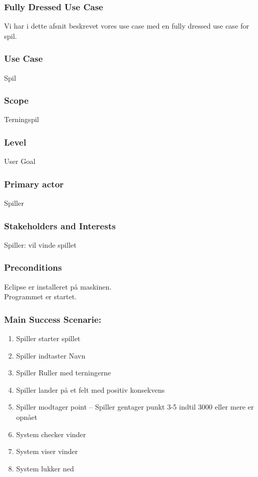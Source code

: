\subsubsection{Fully Dressed Use Case}
Vi har i dette afsnit beskrevet vores use case med en fully dressed use case for spil.
\subsubsection*{Use Case}
Spil
\subsubsection*{Scope}
Terningspil
\subsubsection*{Level}
User Goal
\subsubsection*{Primary actor}
Spiller
\subsubsection*{Stakeholders and Interests}
Spiller: vil vinde spillet
\subsubsection*{Preconditions}
Eclipse er installeret på maskinen.
\\
Programmet er startet.
\subsubsection*{Main Success Scenarie:}
\begin{enumerate}
\item Spiller starter spillet
\item Spiller indtaster Navn
\item Spiller Ruller med terningerne
\item Spiller lander på et felt med positiv konsekvens
\item Spiller modtager point
-- Spiller gentager punkt 3-5 indtil 3000 eller mere er opnået
\item System checker vinder
\item System viser vinder
\item System lukker ned
\end{enumerate}
